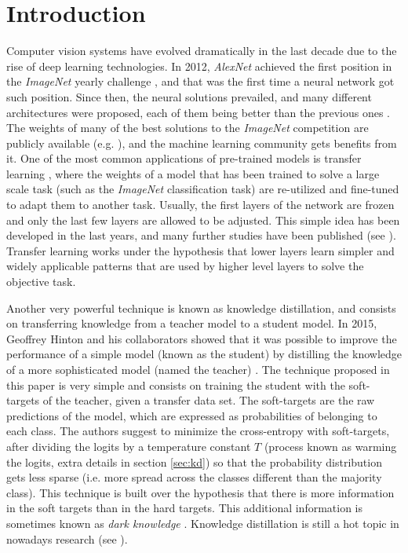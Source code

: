 \documentclass{elsarticle}
\begin{document}
	\linenumbers

	\section{Introduction}
	Computer vision systems have evolved dramatically in the last decade due to the rise of deep learning technologies. In 2012, \textit{AlexNet} \citep{krizhevsky2012} achieved the first position in the \textit{ImageNet} yearly challenge \citep{ILSVRC15}, and that was the first time a neural network got such position. Since then, the neural solutions prevailed, and many different architectures were proposed, each of them being better than the previous ones \citep{khan2020, algan2021}. The weights of many of the best solutions to the \textit{ImageNet} competition are publicly available (e.g. \cite{he2016, chollet2017, szegedy2016, szegedy2017, howard2017, pham2018, tan2019}), and the machine learning community gets benefits from it. One of the most common applications of pre-trained models is transfer learning \citep{huang2021}, where the weights of a model that has been trained to solve a large scale task (such as the \textit{ImageNet} classification task) are re-utilized and fine-tuned to adapt them to another task. Usually, the first layers of the network are frozen and only the last few layers are allowed to be adjusted. This simple idea has been developed in the last years, and many further studies have been published (see \citep{zhu2018, wu2021, pzhao2021}). Transfer learning works under the hypothesis that lower layers learn simpler and widely applicable patterns that are used by higher level layers to solve the objective task.

	Another very powerful technique is known as knowledge distillation, and consists on transferring knowledge from a teacher model to a student model. In 2015, Geoffrey Hinton and his collaborators showed that it was possible to improve the performance of a simple model (known as the student) by distilling the knowledge of a more sophisticated model (named the teacher) \citep{hinton2015}. The technique proposed in this paper is very simple and consists on training the student with the soft-targets of the teacher, given a transfer data set. The soft-targets are the raw predictions of the model, which are expressed as probabilities of belonging to each class. The authors suggest to minimize the cross-entropy with soft-targets, after dividing the logits by a temperature constant $T$ (process known as warming the logits, extra details in section \ref{sec:kd}) so that the probability distribution gets less sparse (i.e. more spread across the classes different than the majority class). This technique is built over the hypothesis that there is more information in the soft targets than in the hard targets. This additional information is sometimes known as \textit{dark knowledge} \citep{gou2020}. Knowledge distillation is still a hot topic in nowadays research (see \cite{tan2021, zhao2021, lee2021}).
\end{document}
